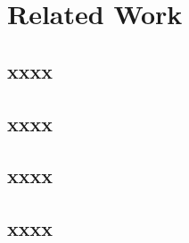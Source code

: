 
\section{Related Work}
\label{sec:RelatedWork}


\subsection{xxxx}
\label{subsec:xxxxx}



\subsection{xxxx}
\label{subsec:xxxxxx}



\subsection{xxxx}
\label{subsec:xxxxxx}



\subsection{xxxx}
\label{subsec:xxxxxx}



